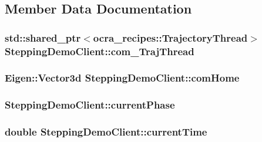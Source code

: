 \subsection{\-Member \-Data \-Documentation}
\hypertarget{classSteppingDemoClient_a9f3d1cdc49cc26a10f9b8fb0d0c68cab}{
\subsubsection[{com\-\_\-\-Traj\-Thread}]{\setlength{\rightskip}{0pt plus 5cm}std\-::shared\-\_\-ptr$<$ocra\-\_\-recipes\-::\-Trajectory\-Thread$>$ {\bf \-Stepping\-Demo\-Client\-::com\-\_\-\-Traj\-Thread}}}\label{classSteppingDemoClient_a9f3d1cdc49cc26a10f9b8fb0d0c68cab}
\hypertarget{classSteppingDemoClient_aa018c1f2734d63f962be512461c9e010}{
\subsubsection[{com\-Home}]{\setlength{\rightskip}{0pt plus 5cm}\-Eigen\-::\-Vector3d {\bf \-Stepping\-Demo\-Client\-::com\-Home}}}\label{classSteppingDemoClient_aa018c1f2734d63f962be512461c9e010}
\hypertarget{classSteppingDemoClient_afe0aa2a02ea8117d644bf5444a03ac62}{
\subsubsection[{current\-Phase}]{ {\bf \-Stepping\-Demo\-Client\-::current\-Phase}}}\label{classSteppingDemoClient_afe0aa2a02ea8117d644bf5444a03ac62}
\hypertarget{classSteppingDemoClient_a1bb7d42cf09778349ae1ecd31d2ac116}{
\subsubsection[{current\-Time}]{\setlength{\rightskip}{0pt plus 5cm}double {\bf \-Stepping\-Demo\-Client\-::current\-Time}}}\label{classSteppingDemoClient_a1bb7d42cf09778349ae1ecd31d2ac116}
